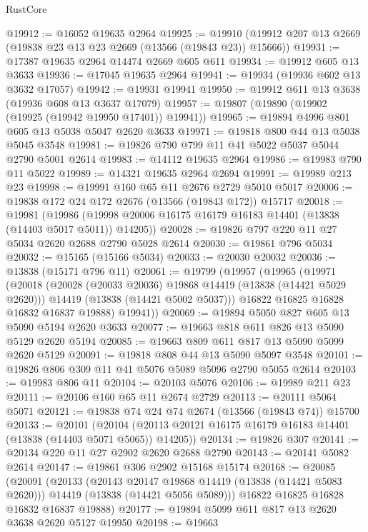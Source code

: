 \begin{lexlean}{RustCore}
\begin{coremodule}
@19912 := @16052 @19635 @2964
@19925 := @19910 (@19912 @207 @13 @2669 (@19838 @23 @13 @23 @2669 (@13566 (@19843 @23)) @15666))
@19931 := @17387 @19635 @2964 @14474 @2669 @605 @611
@19934 := @19912 @605 @13 @3633
@19936 := @17045 @19635 @2964
@19941 := @19934 (@19936 @602 @13 @3632 @17057)
@19942 := @19931 @19941
@19950 := @19912 @611 @13 @3638 (@19936 @608 @13 @3637 @17079)
@19957 := @19807 (@19890 (@19902 (@19925 (@19942 @19950 @17401)) @19941))
@19965 := @19894 @4996 @801 @605 @13 @5038 @5047 @2620 @3633
@19971 := @19818 @800 @44 @13 @5038 @5045 @3548
@19981 := @19826 @790 @799 @11 @41 @5022 @5037 @5044 @2790 @5001 @2614
@19983 := @14112 @19635 @2964
@19986 := @19983 @790 @11 @5022
@19989 := @14321 @19635 @2964 @2694
@19991 := @19989 @213 @23
@19998 := @19991 @160 @65 @11 @2676 @2729 @5010 @5017
@20006 := @19838 @172 @24 @172 @2676 (@13566 (@19843 @172)) @15717
@20018 := @19981
    (@19986 (@19998 @20006 @16175 @16179 @16183 @14401 (@13838 (@14403 @5017 @5011)) @14205))
@20028 := @19826 @797 @220 @11 @27 @5034 @2620 @2688 @2790 @5028 @2614
@20030 := @19861 @796 @5034
@20032 := @15165 (@15166 @5034)
@20033 := @20030 @20032
@20036 := @13838 (@15171 @796 @11)
@20061 := @19799
    (@19957
      (@19965
        (@19971
          (@20018
            (@20028 (@20033 @20036) @19868 @14419 (@13838 (@14421 @5029 @2620)))
            @14419
            (@13838 (@14421 @5002 @5037)))
          @16822
          @16825
          @16828
          @16832
          @16837
          @19888)
        @19941))
@20069 := @19894 @5050 @827 @605 @13 @5090 @5194 @2620 @3633
@20077 := @19663 @818 @611 @826 @13 @5090 @5129 @2620 @5194
@20085 := @19663 @809 @611 @817 @13 @5090 @5099 @2620 @5129
@20091 := @19818 @808 @44 @13 @5090 @5097 @3548
@20101 := @19826 @806 @309 @11 @41 @5076 @5089 @5096 @2790 @5055 @2614
@20103 := @19983 @806 @11
@20104 := @20103 @5076
@20106 := @19989 @211 @23
@20111 := @20106 @160 @65 @11 @2674 @2729
@20113 := @20111 @5064 @5071
@20121 := @19838 @74 @24 @74 @2674 (@13566 (@19843 @74)) @15700
@20133 := @20101
    (@20104 (@20113 @20121 @16175 @16179 @16183 @14401 (@13838 (@14403 @5071 @5065)) @14205))
@20134 := @19826 @307
@20141 := @20134 @220 @11 @27 @2902 @2620 @2688 @2790
@20143 := @20141 @5082 @2614
@20147 := @19861 @306 @2902 @15168 @15174
@20168 := @20085
    (@20091
      (@20133
        (@20143 @20147 @19868 @14419 (@13838 (@14421 @5083 @2620)))
        @14419
        (@13838 (@14421 @5056 @5089)))
      @16822
      @16825
      @16828
      @16832
      @16837
      @19888)
@20177 := @19894 @5099 @611 @817 @13 @2620 @3638 @2620 @5127 @19950
@20198 := @19663

\end{coremodule}
\end{lexlean}
